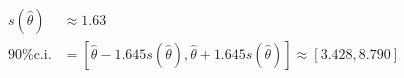\begin{align*}
	s(\hat{\theta})  &\approx 1.63 \\
	\text{90\% c.i.} &= [\hat{\theta}-1.645s(\hat{\theta}),\hat{\theta}+1.645s(\hat{\theta})]	\approx [3.428,8.790]
\end{align*}